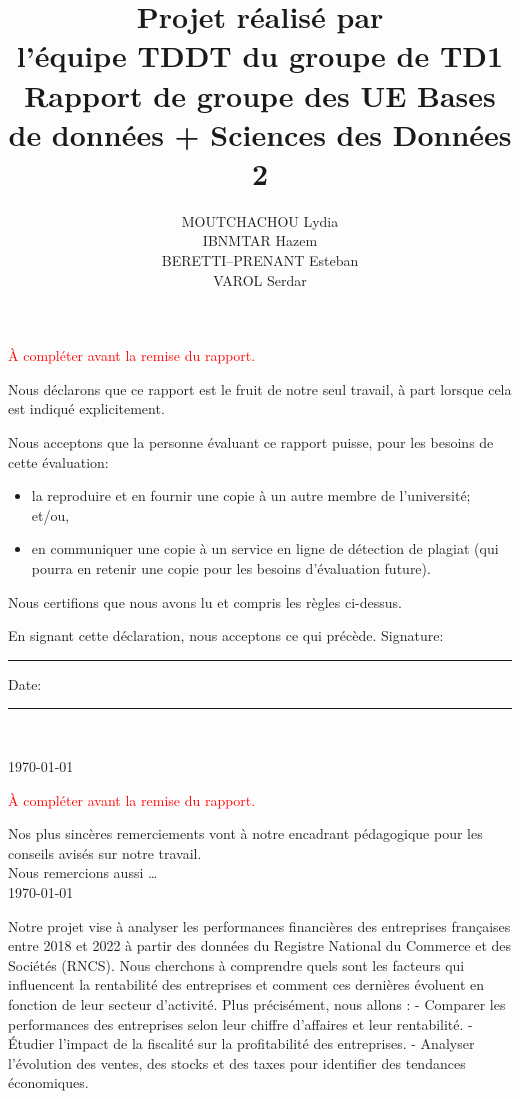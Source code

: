 \documentclass[mstat,12pt]{unswthesis}
\title{Projet réalisé par\\[0.5cm] l'équipe TDDT du groupe de TD1 \\[3cm]Rapport
de groupe des UE \newline  Bases de données + Sciences des Données 2}
\author{
  \begin{tabular}{c}
  MOUTCHACHOU Lydia \\
  IBNMTAR Hazem \\
  BERETTI--PRENANT Esteban \\
  VAROL Serdar
  \end{tabular}
}
\begin{document}
\beforepreface




\textcolor{red}{À compléter avant la remise du rapport.}

\vskip 2pc \noindent Nous déclarons que ce rapport est le fruit de notre seul travail, à part lorsque cela est indiqué  explicitement. 

\vskip 2pc  \noindent Nous acceptons que la personne évaluant ce rapport puisse, pour les besoins de cette évaluation:
\begin{itemize}
\item la reproduire et en fournir une copie à un autre membre de l'université; et/ou,
\item en communiquer une copie à un service en ligne de détection de plagiat (qui pourra en retenir une copie pour les besoins d'évaluation future).
\end{itemize}

\vskip 2pc \noindent Nous certifions que nous avons lu et compris les règles ci-dessus.\vspace{24pt}

\vskip 2pc \noindent En signant cette déclaration, nous acceptons ce qui précède.
\vskip 2pc \noindent
Signature: \rule{7cm}{0.25pt} \hfill Date: \rule{4cm}{0.25pt} \\[1cm]
\vskip 1pc


{\bigskip\bigskip\bigskip\noindent} \today




\textcolor{red}{À compléter avant la remise du rapport.}

{\bigskip}Nos plus sincères remerciements vont à notre encadrant
pédagogique pour les conseils avisés sur notre travail.\\[1cm] Nous
remercions aussi \ldots{}\\[1cm] 

{\bigskip\bigskip\bigskip\noindent} \today




Notre projet vise à analyser les performances financières des
entreprises françaises entre 2018 et 2022 à partir des données du
Registre National du Commerce et des Sociétés (RNCS). Nous cherchons à
comprendre quels sont les facteurs qui influencent la rentabilité des
entreprises et comment ces dernières évoluent en fonction de leur
secteur d'activité. Plus précisément, nous allons : - Comparer les
performances des entreprises selon leur chiffre d'affaires et leur
rentabilité. - Étudier l'impact de la fiscalité sur la profitabilité des
entreprises. - Analyser l'évolution des ventes, des stocks et des taxes
pour identifier des tendances économiques.
\end{document}
